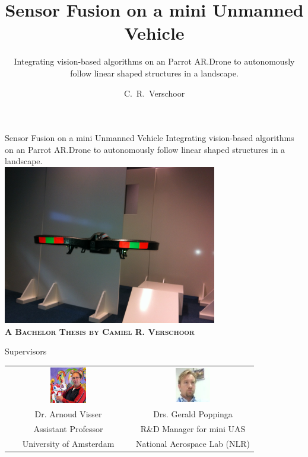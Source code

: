 \documentclass{beamer}
\title[Sensor Fusion on a mini Unmanned Vehicle]
{Sensor Fusion on a mini Unmanned Vehicle}
\subtitle{Integrating vision-based algorithms on an Parrot AR.Drone to autonomously follow linear shaped structures in a landscape.}
\author[Verschoor ] %
{C.~R.~Verschoor}
\institute[University of Amsterdam] %
{
  Faculty of Science (FNWI) \\
  University of Amsterdam
}
\begin{document}
\begin{frame}[plain]
\begin{center}
\Large Sensor Fusion on a mini Unmanned Vehicle
\normalsize Integrating vision-based algorithms on an Parrot AR.Drone to autonomously follow linear shaped structures in a landscape.\\\vspace{0.3cm}\small
\includegraphics[width=0.7\textwidth]{images/title.jpg}\\\vspace{0.5cm}
\textbf{\textsc{A Bachelor Thesis by Camiel R. Verschoor}}
\end{center}
\end{frame}

\begin{frame}
  \titlepage
\end{frame}

\begin{frame}{Supervisors}
\begin{center}
\begin{tabular}{ c c }
\includegraphics[width = 0.3\textwidth]{images/visser.jpg} & \includegraphics[width = 0.3\textwidth]{images/poppinga.jpg}\\
Dr. Arnoud Visser & Drs. Gerald Poppinga\\
Assistant Professor & R\&D Manager for mini UAS\\
University of Amsterdam & National Aerospace Lab (NLR)
\end{tabular}
\end{center}
\end{frame}
\end{document}
